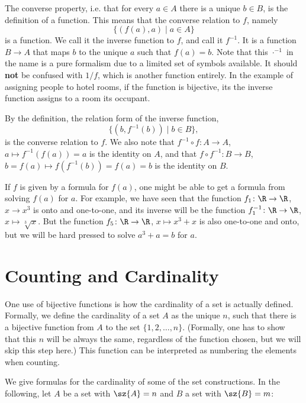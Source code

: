 The converse property, i.e. that for every
$a\in A$ there is a unique $b\in B$, is the definition of a function. This means that
the converse relation to $f$, namely
\[
\{(f(a),a)\mid a\in A\}
\]
is a function. We call it the inverse function to $f$, and call it $f^{-1}$. It is a
function $B\to A$ that maps $b$ to the unique $a$ such that $f(a)=b$.
Note that
this $\cdot^{-1}$ in the name is a pure formalism due to a limited set of symbols available. It
should \textbf{not} be confused with $1/f$, which is another function entirely.
In the example of assigning people to hotel rooms, if the function is bijective, its the
inverse function assigns to a room its occupant.

By the definition, the relation form of the inverse function,
\[
\{(b,f^{-1}(b))\mid b\in B\},
\]
is the converse relation to $f$. We also
note that $f^{-1}\circ f\colon A\to A$, $a\mapsto f^{-1}(f(a))=a$ is the identity
on $A$, and that $f\circ f^{-1}\colon B\to B$, $b=f(a)\mapsto f(f^{-1}(b))=f(a)=b$ is
the identity on $B$.
\medskip

If $f$ is given by a formula for $f(a)$, one might be able to get a formula  from
solving $f(a)$ for $a$. For example, we have seen that the function $f_1\colon\R\to\R$,
$x\to x^3$ is onto and one-to-one, and its inverse will be the function
$f_1^{-1}\colon\R\to\R$, $x\mapsto\sqrt[3]{x}$. But the function $f_5\colon\R\to\R$,
$x\mapsto x^3+x$ is also one-to-one and  onto, but we will be hard pressed to solve
$a^3+a=b$ for $a$.

\section{Counting and Cardinality}
\label{defcardinality}

One use of bijective functions is how the cardinality of a set is actually defined.
Formally, we
define the cardinality of a set $A$ as the unique $n$, such that there is a bijective
function from $A$ to the set $\{1,2,\ldots,n\}$. (Formally, one has to show that this
$n$ will be always the same, regardless of the function chosen, but we will skip this
step here.) This function can be interpreted as numbering the elements when counting.

We give formulas for the cardinality of some of the set constructions. In the following,
let $A$ be a set with $\sz{A}=n$ and $B$ a set with $\sz{B}=m$:

